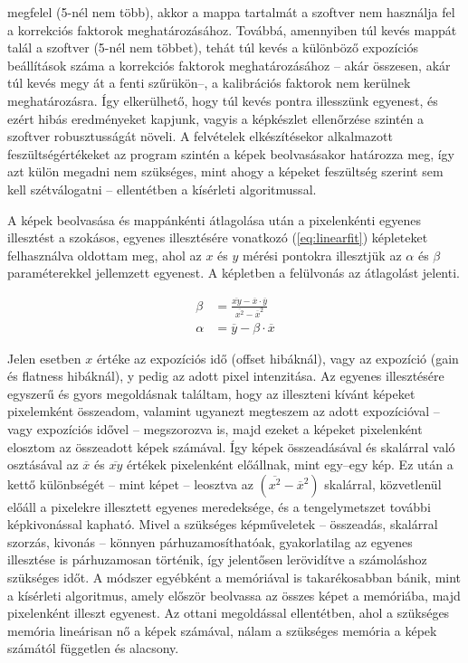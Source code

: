\documentclass[a4paper,12pt]{article}
\begin{document}
megfelel (5-nél nem több), akkor a mappa tartalmát a szoftver nem használja fel a korrekciós faktorok meghatározásához. Továbbá, amennyiben túl kevés mappát talál a szoftver (5-nél nem többet), tehát túl kevés a különböző expozíciós beállítások száma a korrekciós faktorok meghatározásához -- akár összesen, akár túl kevés megy át a fenti szűrükön--, a kalibrációs  faktorok nem kerülnek meghatározásra. Így elkerülhető, hogy túl kevés pontra illesszünk egyenest, és ezért hibás eredményeket kapjunk, vagyis a képkészlet ellenőrzése szintén a szoftver robusztusságát növeli. A felvételek elkészítésekor alkalmazott feszültségértékeket az program szintén a képek beolvasásakor határozza meg, így azt külön megadni nem szükséges, mint ahogy a képeket feszültség szerint sem kell szétválogatni -- ellentétben a kísérleti algoritmussal.

A képek beolvasása és mappánkénti  átlagolása után a pixelenkénti egyenes illesztést a szokásos, egyenes illesztésére vonatkozó (\ref{eq:linearfit}) képleteket felhasználva oldottam meg, ahol az $x$ és $y$ mérési pontokra illesztjük az $\alpha$ és $\beta$ paraméterekkel jellemzett egyenest.  A képletben a felülvonás az átlagolást jelenti.

\begin{equation}
\label{eq:linearfit}
\begin{split}
\beta &= \frac{ \overline{xy} - \overline x \cdot \overline y }{\overline{x^2} - {\overline{x}}^2}\\
\alpha &= \overline y -\beta \cdot \overline x
\end{split}
\end{equation}


Jelen esetben $x$ értéke az expozíciós idő (offset hibáknál), vagy az expozíció (gain és flatness hibáknál), y pedig az adott pixel intenzitása. Az egyenes illesztésére egyszerű és gyors megoldásnak találtam, hogy az illeszteni kívánt képeket pixelemként összeadom, valamint ugyanezt megteszem az adott expozícióval -- vagy expozíciós idővel -- megszorozva is, majd ezeket a képeket pixelenként elosztom az összeadott képek számával. Így képek összeadásával és skalárral való osztásával az $\overline x$ és $\overline{xy}$ értékek pixelenként előállnak, mint egy--egy kép. Ez után a kettő különbségét -- mint képet -- leosztva az  $\left ( \overline{x^2} - {\overline{x}}^2\right )$ skalárral, közvetlenül előáll a pixelekre illesztett egyenes meredeksége, és a tengelymetszet további képkivonással kapható. Mivel a szükséges képműveletek -- összeadás, skalárral szorzás, kivonás -- könnyen párhuzamosíthatóak, gyakorlatilag az egyenes illesztése is párhuzamosan történik, így jelentősen lerövidítve a számoláshoz szükséges időt. 
 A módszer egyébként a memóriával is takarékosabban bánik, mint a kísérleti algoritmus, amely először beolvassa az összes képet a memóriába, majd pixelenként illeszt egyenest. Az ottani megoldással ellentétben, ahol a szükséges memória lineárisan nő a képek számával, nálam a szükséges memória a képek számától független és alacsony.
\end{document}
